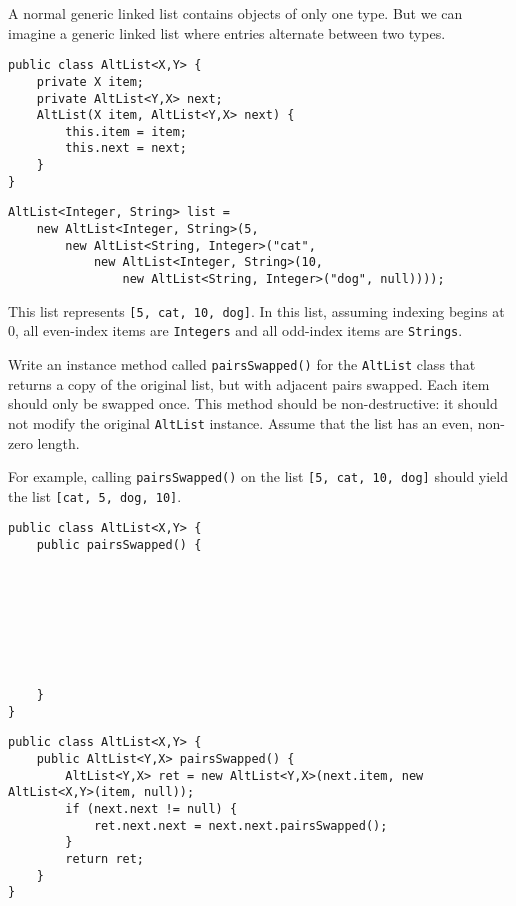 \question
\begin{blocksection}
A normal generic linked list contains objects of only one type. But
we can imagine a generic linked list where entries alternate between two types.
\end{blocksection}

\begin{lstlisting}
public class AltList<X,Y> {
    private X item;
    private AltList<Y,X> next;
    AltList(X item, AltList<Y,X> next) {
        this.item = item;
        this.next = next;
    }
}
\end{lstlisting}

\begin{lstlisting}
AltList<Integer, String> list =
    new AltList<Integer, String>(5,
        new AltList<String, Integer>("cat",
            new AltList<Integer, String>(10,
                new AltList<String, Integer>("dog", null))));
\end{lstlisting}

This list represents \lstinline$[5, cat, 10, dog]$. In this list, assuming
indexing begins at 0, all even-index items are \lstinline$Integers$ and all
odd-index items are \lstinline$Strings$.

Write an instance method called \lstinline$pairsSwapped()$ for the
\lstinline$AltList$ class that returns a copy of the original list, but with
adjacent pairs swapped. Each item should only be swapped once. This method
should be non-destructive: it should not modify the original
\lstinline$AltList$ instance. Assume that the list has an even, non-zero
length.

For example, calling \lstinline$pairsSwapped()$ on the list \lstinline$[5, cat, 10, dog]$ should yield the list \lstinline$[cat, 5, dog, 10]$.

\ifprintanswers\else
\begin{lstlisting}
public class AltList<X,Y> {
    public pairsSwapped() {








    }
}
\end{lstlisting}
\fi

\begin{solution}
\begin{lstlisting}
public class AltList<X,Y> {
    public AltList<Y,X> pairsSwapped() {
        AltList<Y,X> ret = new AltList<Y,X>(next.item, new AltList<X,Y>(item, null));
        if (next.next != null) {
            ret.next.next = next.next.pairsSwapped();
        }
        return ret;
    }
}
\end{lstlisting}
\end{solution}
